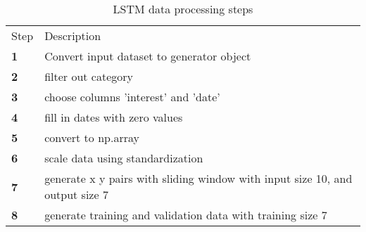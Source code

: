 \begin{table}[h]
  \caption{LSTM data processing steps}
  \label{table:lstm_data_processing_steps}
  \begin{tabular}{ll}
    \toprule
    Step       & Description                                                                  \\
    \textbf{1} & Convert input dataset to generator object                                    \\
    \textbf{2} & filter out category                                                          \\
    \textbf{3} & choose columns 'interest' and 'date'                                         \\
    \textbf{4} & fill in dates with zero values                                               \\
    \textbf{5} & convert to np.array                                                          \\
    \textbf{6} & scale data using standardization                                             \\
    \textbf{7} & generate x y pairs with sliding window with input size 10, and output size 7 \\
    \textbf{8} & generate training and validation data with training size 7                   \\
    \bottomrule
  \end{tabular}
\end{table}


